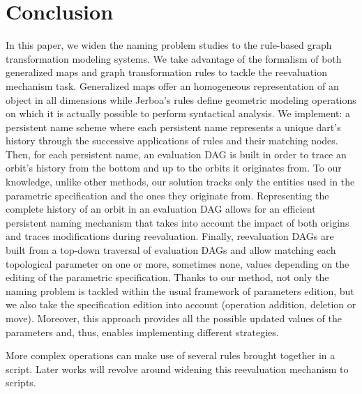 \section{Conclusion}


In this paper, we widen the naming problem studies to the rule-based graph transformation modeling systems. %
We take advantage of the formalism of both generalized maps and graph transformation rules  to tackle the reevaluation mechanism task. %
Ge\-ne\-ra\-li\-zed maps offer an homogeneous representation of an object in all
dimensions while Jerboa's rules %
define
geometric
modeling o\-pe\-ra\-tions on which it is actually possible to perform syntactical
a\-na\-ly\-sis. %
We implement: a persistent name scheme where each persistent name represents a unique 
dart's history through the successive %
applications of rules 
and their matching nodes. 
Then, for each per\-sis\-tent name, an evaluation DAG
is built in order to trace an orbit's history from the bottom and up to the
orbits it originates from. %
To our knowledge, unlike other methods, our solution tracks only the entities used in the parametric specification and the ones they o\-ri\-gi\-na\-te from.
Representing the complete history of an orbit in an e\-va\-lua\-tion DAG allows for an
efficient persistent naming mechanism that takes into account the impact of both
origins and traces mo\-di\-fi\-ca\-tions during reevaluation. %
Finally, reevaluation DAGs are built from a top-down traversal of evaluation DAGs and
allow matching each topological parameter on one or more,  sometimes none, va\-lues depending on the editing of the parametric specification. %
Thanks to our method,
not only the naming problem is tackled within the usual framework of parameters edition, but we also take the spe\-ci\-fi\-ca\-tion edition into account (operation addition, deletion or move).
Moreover, this approach provides all the possible updated values of the parameters and, thus, enables implementing different strategies.

More complex operations can make use of several rules 
brought together
in a script. %
Later works will revolve around widening this reevaluation mechanism
to scripts. %

